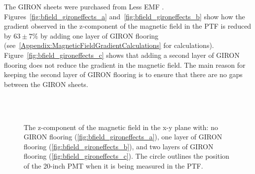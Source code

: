 The GIRON sheets were purchased from Less EMF \cite{lessemf}. Figures~\ref{fig:bfield_gironeffects_a} and~\ref{fig:bfield_gironeffects_b} show how the gradient observed in the z-component of the magnetic field in the PTF is reduced by $ 63\pm7\% $ by adding one layer of GIRON flooring (see~\ref{Appendix:MagneticFieldGradientCalculations} for calculations).
Figure~\ref{fig:bfield_gironeffects_c} shows that adding a second layer of GIRON flooring does not reduce the gradient in the magnetic field. The main reason for keeping the second layer of GIRON flooring is to ensure that there are no gaps between the GIRON sheets.
%
\begin{figure}[htbp]
  \begin{center}
    \\
    \vspace{-3 mm}
    \\
    \vspace{-3 mm}
  \caption{The z-component of the magnetic field in the x-y plane with: no GIRON flooring (\ref{fig:bfield_gironeffects_a}), one layer of GIRON flooring (\ref{fig:bfield_gironeffects_b}), and two layers of GIRON flooring (\ref{fig:bfield_gironeffects_c}). The circle outlines the position of the 20-inch PMT when it is being measured in the PTF.}
  \label{fig:bfield_gironeffects}
  \end{center}
\end{figure}
%

